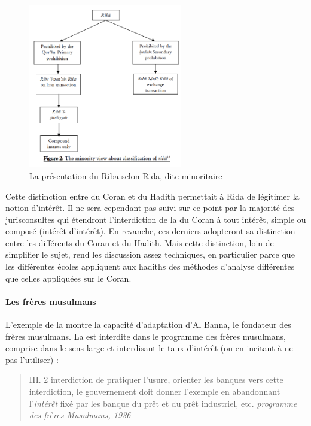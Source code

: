  \begin{figure}[h!]
     \centering
      \includegraphics[width=0.6\textwidth]{CourantsIslamContemporain/ImagesCourantsIslamContemporain/RibaRida.png}
      \caption{La présentation du Riba selon Rida, dite minoritaire}
     \label{fig:MinorityRiba}
 \end{figure}
 Cette distinction entre \riba du Coran et \riba du Hadith permettait à Rida de légitimer la notion d'intérêt. Il ne sera cependant pas suivi sur ce point par la majorité des jurisconsultes qui étendront l'interdiction de la \riba du Coran à tout intérêt, simple ou composé (intérêt d'intérêt). En revanche, ces derniers adopteront sa distinction entre les différents \riba du Coran et du Hadith. Mais cette distinction, loin de simplifier le sujet, rend les discussion assez techniques, en particulier parce que les différentes écoles appliquent aux hadiths des méthodes d'analyse différentes que celles appliquées sur le Coran. 
 

 
\paragraph{Les frères musulmans} L'exemple de la \riba montre la capacité d'adaptation d'Al Banna, le fondateur des frères musulmans.
La \riba est interdite dans le programme des frères musulmans, comprise dans le sens large et interdisant le taux d'intérêt (ou en incitant à ne pas l'utiliser) : 
\begin{quote}
    III. 2 interdiction de pratiquer l'usure, orienter les banques vers cette interdiction, le gouvernement doit donner l'exemple en abandonnant l'\textit{intérêt} fixé par les banque du prêt et du prêt industriel, etc. \textit{programme des frères Musulmans, 1936}
\end{quote}

